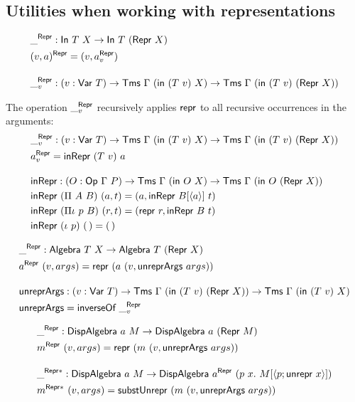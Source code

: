\subsection{Utilities when working with representations}

\begin{align*}
&\_^{\mta{Repr}} : \mta{In}\ T\ X \to \mta{In}\ T\ (\mta{Repr}\ X) \\
&(v, a)^{\mta{Repr}} = (v, a^{\mta{Repr}}_v) \\[1em]
&\_^{\mta{Repr}}_v : (v : \mta{Var}\ T) \to \Tms\ \Gamma\ (\mta{in}\ (T\ v)\ X) \to \Tms\ \Gamma\ (\mta{in}\ (T\ v)\ (\mta{Repr}\ X))
\end{align*}

The operation $\_^{\textsf{Repr}}_v$ recursively applies $\textsf{repr}$ to all recursive occurrences in the arguments:
\begin{align*}
&\_^{\mta{Repr}}_v : (v : \mta{Var}\ T) \to \Tms\ \Gamma\ (\mta{in}\ (T\ v)\ X) \to \Tms\ \Gamma\ (\mta{in}\ (T\ v)\ (\mta{Repr}\ X)) \\
&a^{\mta{Repr}}_v = \mta{inRepr}\ (T\ v)\ a \\[1em]
&\mta{inRepr} : (O : \mta{Op}\ \Gamma\ P) \to \Tms\ \Gamma\ (\mta{in}\ O\ X) \to \Tms\ \Gamma\ (\mta{in}\ O\ (\mta{Repr}\ X)) \\
&\mta{inRepr}\ (\Pi\ A\ B)\ (a, t) = (a, \mta{inRepr}\ B[\Msub{a}]\ t) \\
&\mta{inRepr}\ (\Pi\iota\ p\ B)\ (r, t) = (\mta{repr}\ r, \mta{inRepr}\ B\ t) \\
&\mta{inRepr}\ (\iota\ p)\ (\,) = (\,)
\end{align*}

\begin{align*}
&\_^{\mta{Repr}} : \mta{Algebra}\ T\ X \to \mta{Algebra}\ T\ (\mta{Repr}\ X) \\
&a^{\mta{Repr}}\ (v, args) = \mta{repr}\ (a\ (v, \mta{unreprArgs}\ args)) \\[1em]
&\mta{unreprArgs} : (v : \mta{Var}\ T) \to \Tms\ \Gamma\ (\mta{in}\ (T\ v)\ (\mta{Repr}\ X)) \to \Tms\ \Gamma\ (\mta{in}\ (T\ v)\ X) \\
&\mta{unreprArgs} = \mta{inverseOf}\ \_^{\mta{Repr}}_v
\end{align*}

\begin{align*}
&\_^{\mta{Repr}} : \mta{DispAlgebra}\ a\ M \to \mta{DispAlgebra}\ a\ (\mta{Repr}\ M) \\
&m^{\mta{Repr}}\ (v, args) = \mta{repr}\ (m\ (v, \mta{unreprArgs}\ args)) \\[1em]
&\_^{\mta{Repr}*} : \mta{DispAlgebra}\ a\ M \to \mta{DispAlgebra}\ a^{\mta{Repr}}\ (p\ x .\ M[\Msub{p;\mta{unrepr}\ x}]) \\
&m^{\mta{Repr}*}\ (v, args) = \mta{substUnrepr}\ (m\ (v, \mta{unreprArgs}\ args))
\end{align*}

